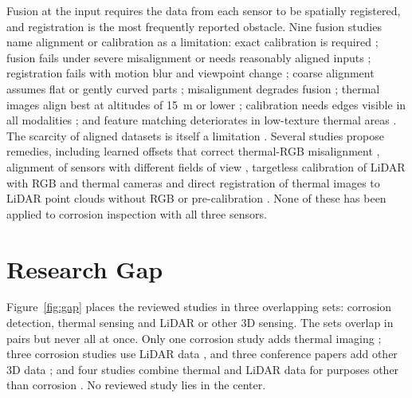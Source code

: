 Fusion at the input requires the data from each sensor to be spatially
registered, and registration is the most frequently reported obstacle. Nine
fusion studies name alignment or calibration as a limitation: exact calibration
is required \citep{Cheng2025}; fusion fails under severe misalignment \citep{Zhu2026} or needs
reasonably aligned inputs \citep{Xu2026}; registration fails with motion blur and
viewpoint change \citep{Bin2023}; coarse alignment assumes flat or gently curved parts
\citep{Li2024c}; misalignment degrades fusion \citep{Cao2026}; thermal images align best at
altitudes of 15~m or lower \citep{Nooralishahi2022}; calibration needs edges visible in all
modalities \citep{Yang2024}; and feature matching deteriorates in low-texture thermal areas
\citep{Zhu2026a}. The scarcity of aligned datasets is itself a limitation \citep{Hou2024}. Several studies propose remedies, including learned
offsets that correct thermal-RGB misalignment \citep{Liu2025}, alignment of sensors with
different fields of view \citep{Shahsavarani2024}, targetless calibration of LiDAR with RGB and
thermal cameras \citep{Tran2024,Yang2024} and direct registration of thermal images to LiDAR
point clouds without RGB or pre-calibration \citep{Zhu2026a}. None of these has been
applied to corrosion inspection with all three sensors.

\section{Research Gap}
\label{sec:lr-gap}

Figure~\ref{fig:gap} places the reviewed studies in three overlapping sets:
corrosion detection, thermal sensing and LiDAR or other 3D sensing. The sets
overlap in pairs but never all at once. Only one corrosion study adds thermal
imaging \citep{Lim2021}; three corrosion studies use LiDAR data \citep{Maru2025,PimenteldeFigueiredo2025,PallasEnguita2025}, and
three conference papers add other 3D data \citep{Ding2025,Zheng2025,Haitz2022}; and four studies combine thermal and LiDAR data
for purposes other than corrosion \citep{Tran2025,Tran2024,Yang2024,Zhu2026a}. No reviewed study lies in
the center.

